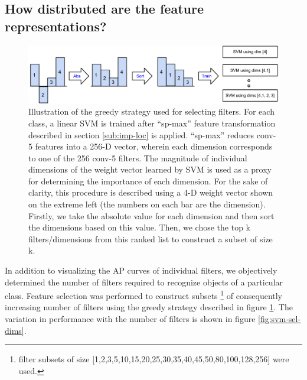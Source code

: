 \subsection{How distributed are the feature representations?}
\label{sub:how-many}
\begin{figure}[t!]
\centering
\includegraphics[scale=0.35]{images/how-many.pdf}
\caption{Illustration of the greedy strategy used for selecting filters. For each class, a linear SVM is trained after ``sp-max'' feature transformation described in section \ref{sub:imp-loc} is applied. ``sp-max''  reduces conv-5 features into a 256-D vector, wherein each dimension corresponds to one of the 256 conv-5 filters. The magnitude of individual dimensions of the weight vector learned by SVM is used as a proxy for determining the importance of each dimension. For the sake of clarity, this procedure is described using a 4-D weight vector shown on the extreme left (the numbers on each bar are the dimension). Firstly, we take the absolute value for each dimension and then sort the dimensions based on this value. Then, we chose the top k filters/dimensions from this ranked list to construct a subset of size k.}
\label{fig:sel-strategy}
\end{figure}

In addition to visualizing the AP curves of individual filters, we objectively determined the number of filters required to recognize objects of a particular class. Feature selection was performed to construct subsets \footnote{filter subsets of size [1,2,3,5,10,15,20,25,30,35,40,45,50,80,100,128,256] were used.} of consequently increasing number of filters using the greedy strategy described in figure \ref{fig:sel-strategy}. The variation in performance with the number of filters is shown in figure \ref{fig:svm-sel-dims}. 

